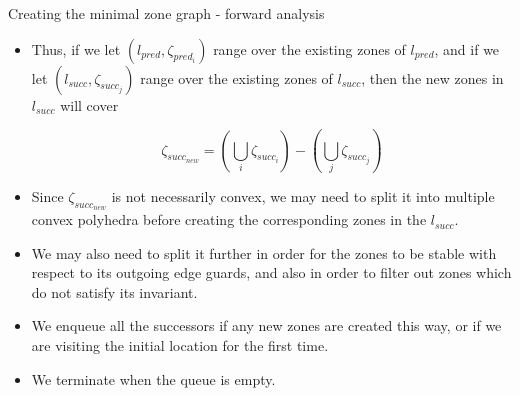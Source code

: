 \documentclass{beamer}
\begin{document}
\begin{frame}[shrink = 10]{Creating the minimal zone graph - forward analysis}

\begin{itemize}

\item Thus, if we let  $(l_{pred}, \zeta _{pred_{i}})$ range over the
existing zones of $l_{pred}$, and if we let  $(l_{succ}, \zeta
_{succ_{j}})$ range over the existing zones of $l_{succ}$, then the
new zones in $l_{succ}$ will cover

\begin{displaymath} 
  \zeta _{succ_{new}} = (\bigcup _{i} \zeta_{succ_{i}}) - (\bigcup _{j} \zeta_{succ_{j}})
\end{displaymath} 

\item Since $\zeta _{succ_{new}}$ is not necessarily convex, we may need to
split it into multiple convex polyhedra before creating the
corresponding zones in the $l_{succ}$. 

\item We may also need to split it further in order for the zones to
  be stable with respect to its outgoing edge guards, and also in
  order to filter out zones which do not satisfy its invariant.

\item We enqueue all the successors if any new zones are created this
  way, or if we are visiting the initial location for the first time.

\item We terminate when the queue is empty.

\end{itemize}

\end{frame}
\end{document}
